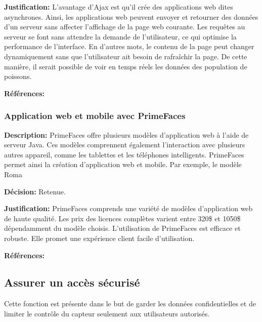 \textbf{Justification:} L'avantage d'Ajax est qu'il crée des applications web dites asynchrones. Ainsi, les applications web peuvent envoyer et retourner des données d'un serveur sans affecter l'affichage de la page web courante. Les requêtes au serveur se font sans attendre la demande de l'utilisateur, ce qui optimise la performance de l'interface. En d'autres mots, le contenu de la page peut changer dynamiquement sans que l'utilisateur ait besoin de rafraîchir la page. De cette manière, il serait possible de voir en temps réels les données des population de poissons. \vspace{5mm}

\textbf{Références:} \cite{Ajax_wiki} \cite{Ajax}

\subsubsection{Application web et mobile avec PrimeFaces}

\textbf{Description:} PrimeFaces offre plusieurs modèles d'application web à l'aide de serveur Java. Ces modèles comprennent également l'interaction avec plusieurs autres appareil, comme les tablettes et les téléphones intelligents. PrimeFaces permet ainsi la création d'application web et mobile. Par exemple, le modèle Roma 

\textbf{Décision:} Retenue.

\textbf{Justification:} PrimeFaces comprends une variété de modèles d'application web de haute qualité. Les prix des licences complètes varient entre 320\$ et 1050\$ dépendamment du modèle choisis. L'utilisation de PrimeFaces est efficace et robuste. Elle promet une expérience client facile d'utilisation.

\textbf{Références:} \cite{PF} \cite{PF_Roma} \cite{PF_exemple}


\subsection{Assurer un accès sécurisé}
Cette fonction est présente dans le but de garder les données confidentielles et de limiter le contrôle du capteur seulement aux utilisateurs autorisés. %

\begin{table}[htp]
   \footnotesize
   \centering
\caption{Accès sécurisé}
\label{t:securite}
\end{table}



